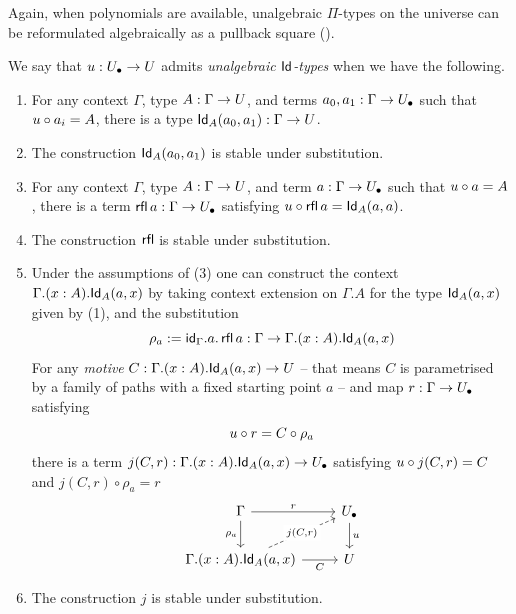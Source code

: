 Again, when polynomials are available,
unalgebraic $\Pi$-types on the universe can be 
reformulated algebraically as a pullback square ().


\begin{definition}
  We say that ${u} : {U_\bullet} \to U$
  admits \emph{unalgebraic $\mathsf{Id}$-types}
  when we have the following.
  \begin{enumerate}
  \item 
    For any context $\Gamma$, type $A : \Gamma \to U$,
    and terms $a_0, a_1 : \Gamma \to {U_\bullet}$ such that
    ${u} \circ a_i = A$,
    there is a type $\mathsf{Id}_A (a_0,a_1) : \Gamma \to U$.
  \item
    The construction $\mathsf{Id}_A (a_0,a_1)$ is stable under substitution.
  \item
    For any context $\Gamma$, type $A : \Gamma \to U$,
    and term $a : \Gamma \to {U_\bullet}$ such that
    ${u} \circ a = A$,
    there is a term $\mathop{\mathsf{rfl}} a : \Gamma \to {U_\bullet}$
    satisfying
    ${u} \circ \mathop{\mathsf{rfl}} a  = \mathsf{Id}_A (a,a)$.
  \item The construction $\mathop{\mathsf{rfl}}$ is stable under substitution.
  \item
    Under the assumptions of (3)
    one can construct the context $\Gamma . (x : A) . \mathsf{Id}_A(a,x)$
    by taking context extension on $\Gamma . A$ for the type
    $\mathsf{Id}_A(a,x)$ given by (1),
    and the substitution
    \[\rho_a := \mathsf{id}_\Gamma . a . \mathop{\mathsf{rfl}} a : \Gamma \to \Gamma . (x : A) . \mathsf{Id}_A(a,x)\]
    For any \emph{motive} $C : \Gamma .(x : A) . \mathsf{Id}_A(a,x) \to U$
    -- that means $C$ is parametrised by a family of paths with a fixed starting point $a$ --
    and map $r : \Gamma \to {U_\bullet}$ satisfying
    \[ {u} \circ r = C \circ \rho_a \]
    there is a term
    $j (C, r) : \Gamma . (x : A) . \mathsf{Id}_A(a,x) \to {U_\bullet}$
    satisfying ${u} \circ j (C, r) = C$ and
    $j (C, r) \circ \rho_a  = r$
    \[\begin{tikzcd}
	   \Gamma & \Ulow \\
	   {\Gamma . (x : A) . \Id_A(a,x)} & \U
	   \arrow["{r}", from=1-1, to=1-2]
	   \arrow["{\rho_a}"', from=1-1, to=2-1]
	   \arrow["\uu", from=1-2, to=2-2]
	   \arrow["{j(C,r)}"{description}, dashed, from=2-1, to=1-2]
	   \arrow["C"', from=2-1, to=2-2]
    \end{tikzcd}\]
  \item The construction $j$ is stable under substitution.
  \end{enumerate}
\end{definition}

